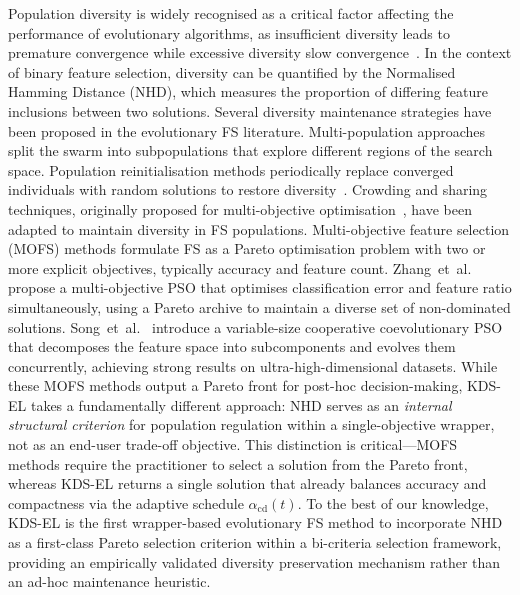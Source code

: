 \documentclass[a4paper,fleqn]{cas-dc}
\begin{document}
\begin{sloppypar}
	\par{
	Population diversity is widely recognised as a critical factor
	affecting the performance of evolutionary algorithms, as insufficient
	diversity leads to premature convergence while excessive diversity
	slow convergence~\citep{morrison2002measurement,ursem2002diversity}.
	In the context of binary feature selection, diversity can be
	quantified by the Normalised Hamming Distance (NHD), which measures
	the proportion of differing feature inclusions between two solutions.
	Several diversity maintenance strategies have been proposed in the
	evolutionary FS literature.
	Multi-population approaches~\citep{MEL_CITE} split the swarm into
	subpopulations that explore different regions of the search space.
	Population reinitialisation methods periodically replace converged
	individuals with random solutions to restore
	diversity~\citep{ursem2002diversity}.
	Crowding and sharing techniques, originally proposed for
	multi-objective optimisation~\citep{deb2002fast}, have been adapted
	to maintain diversity in FS populations.
	Multi-objective feature selection (MOFS) methods formulate FS as a
	Pareto optimisation problem with two or more explicit objectives,
	typically accuracy and feature count.
	Zhang~et~al.~\citep{zhang2020multiobjective} propose a
	multi-objective PSO that optimises classification error and feature
	ratio simultaneously, using a Pareto archive to maintain a diverse
	set of non-dominated solutions.
	Song~et~al.~\citep{song2021variable} introduce a variable-size
	cooperative coevolutionary PSO that decomposes the feature space
	into subcomponents and evolves them concurrently, achieving strong
	results on ultra-high-dimensional datasets.
	While these MOFS methods output a Pareto front for post-hoc
	decision-making, KDS-EL takes a fundamentally different approach:
	NHD serves as an \emph{internal structural criterion} for
	population regulation within a single-objective wrapper, not as an
	end-user trade-off objective.
	This distinction is critical---MOFS methods require the
	practitioner to select a solution from the Pareto front, whereas
	KDS-EL returns a single solution that already balances accuracy and
	compactness via the adaptive schedule $\alpha_{\mathrm{cd}}(t)$.
	To the best of our knowledge, KDS-EL is the first wrapper-based
	evolutionary FS method to incorporate NHD as a first-class Pareto
	selection criterion within a bi-criteria selection framework,
	providing an empirically validated diversity preservation mechanism
	rather than an ad-hoc maintenance heuristic.
	}



\end{sloppypar}
\end{document}
